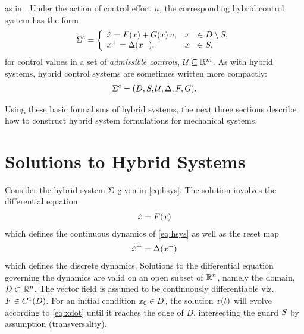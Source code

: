 as in \cite{Sinnet2009}.
%
Under the action of control effort $u$, the corresponding hybrid control
system has the form
%
\begin{align}
  \Sigma^{c} = \left\{
  \begin{array}{l l}
    {\dot {x}} = F(x) + G(x) \, u, & x^{-} \in D \setminus S,\\
    x^{+} = \Delta(x^{-}), & x^{-} \in S,
  \end{array}\right.
  \label{eq:hcsys}
\end{align}
%
for control values in a set of {\em admissible controls}, $\mathcal{U} \subseteq \mathbb{R}^{m}$.
%
As with hybrid systems, hybrid control systems are sometimes written more
compactly:
\begin{align*}
  \Sigma^{c} = (D, S, \mathcal{U}, \Delta, F, G).
\end{align*}

Using these basic formalisms of hybrid systems, the next three sections describe
how to construct hybrid system formulations for mechanical systems.

\section{Solutions to Hybrid Systems} \label{sec:hsys-sol}
Consider the hybrid system $\Sigma$ given in \eqref{eq:hsys}.
%
The solution involves the differential equation
\begin{align}
  \label{eq:xdot}
  {\dot {x}} = F(x)
\end{align}
which defines the continuous dynamics of \eqref{eq:hsys} as well as the reset
map
\begin{align}
  \label{eq:rmap}
  {\dot {x}}^{+} = \Delta(x^{-})
\end{align}
which defines the discrete dynamics.
%
Solutions to the differential equation governing the dynamics are valid on an
open subset of $\mathbb{R}^{n}$, namely the domain, $D \subset \mathbb{R}^{n}$.
%
The vector field is assumed to be continuously differentiable viz. $F \in
C^{1}(D)$.
%
For an initial condition $x_{0} \in D$, the solution $x(t)$ will evolve
according to \eqref{eq:xdot} until it reaches the edge of $D$, intersecting
the guard $S$ by assumption (transversality).

